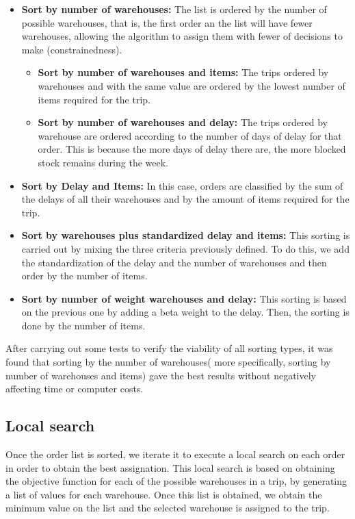 \documentclass[letterpaper]{article} %
\begin{document}
\begin{itemize}
    \item \textbf{Sort by number of warehouses:} The list is ordered by the number of possible warehouses, that is, the first order an the list will have fewer warehouses, allowing the algorithm to assign them with fewer of decisions to make (constrainedness).
    \begin{itemize}
        \item \textbf{Sort by number of warehouses and items:} The trips ordered by warehouses and with the same value are ordered by the lowest number of items required for the trip.
        \item \textbf{Sort by number of warehouses and delay:} The trips ordered by warehouse are ordered according to the number of days of delay for that order. This is because the more days of delay there are, the more blocked stock remains during the week.
    \end{itemize}
    \item \textbf{Sort by Delay and Items:} In this case, orders are classified by the sum of the delays of all their warehouses and by the amount of items required for the trip.

    \item \textbf{Sort by warehouses plus standardized delay and items:} This sorting is carried out by mixing the three criteria previously defined. To do this, we add the standardization of the delay and the number of warehouses and then order by the number of items.
    \item \textbf{Sort by number of weight warehouses and delay:} This sorting is based on the previous one by adding a beta weight to the delay. Then, the sorting is done by the number of items.
\end{itemize}

After carrying out some tests to verify the viability of all sorting types, it was found that sorting by the number of warehouses( more specifically, sorting by number of warehouses and items) gave the best results without negatively affecting time or computer costs.

\subsection*{Local search}

Once the order list is sorted, we iterate it to execute a local search on each order in order to obtain the best assignation. This local search is based on obtaining the objective function for each of the possible warehouses in a trip, by generating a list of values for each warehouse. Once this list is obtained, we obtain the minimum value on the list and the selected warehouse is assigned to the trip.
\end{document}
